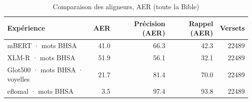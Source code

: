 \begin{table}[ht]
\centering
\caption{Comparaison des aligneurs, AER (toute la Bible)}
\label{tab:comparaison_des_aligneurs_aer_toute_la_bible}
\begin{tabular}{lrrrr}
\toprule
Expérience & AER & Précision (AER) & Rappel (AER) & Versets \\
\midrule
mBERT · mots BHSA & 41.0 & 66.3 & 42.3 & 22489 \\
XLM-R · mots BHSA & 51.9 & 56.1 & 32.1 & 22489 \\
Glot500 · mots BHSA · voyelles & 21.7 & 81.4 & 70.0 & 22489 \\
eflomal · mots BHSA & 3.5 & 97.4 & 93.8 & 22489 \\
\bottomrule
\end{tabular}
\end{table}
